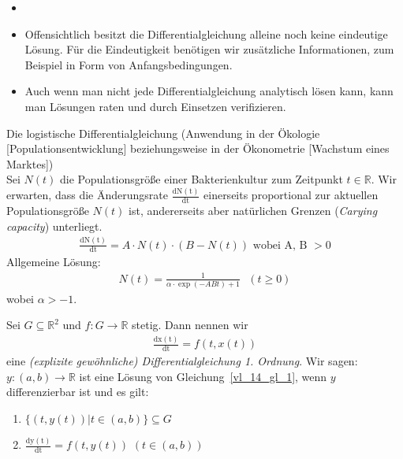 \begin{Bemerkung}{
	\begin{itemize}
		\item[ ]
		\item Offensichtlich besitzt die Differentialgleichung alleine noch keine 
		eindeutige Lösung. Für die Eindeutigkeit benötigen wir zusätzliche
		 Informationen, zum Beispiel in Form von Anfangsbedingungen.
		\item Auch wenn man nicht jede Differentialgleichung analytisch lösen kann, 
		kann man Lösungen raten und durch Einsetzen verifizieren.
	\end{itemize}
}\end{Bemerkung}

\begin{Beispiel}{
	Die logistische Differentialgleichung (Anwendung in der Ökologie 
	[Populationsentwicklung] beziehungsweise in der Ökonometrie [Wachstum 
	eines Marktes]) \\
	Sei $N(t)$ die Populationsgröße einer Bakterienkultur zum Zeitpunkt $t \in 
	\mathbb{R}$. Wir erwarten, dass die Änderungsrate $\frac{\mathrm{dN(t)}}{\mathrm{dt}}$ einerseits proportional zur aktuellen Populationsgröße $N(t)$ ist, 
	andererseits aber natürlichen Grenzen (\emph{Carying capacity}) unterliegt.
	\begin{align*}
		\frac{\mathrm{dN(t)}}{\mathrm{dt}} = A \cdot N(t) \cdot (B - N(t))
		\text{ wobei A, B } > 0
	\end{align*}
	Allgemeine Lösung:
	\begin{align*}
		N(t) = \frac{1}{\alpha \cdot \exp(-ABt) + 1} \text{ }(t \geq 0) 
	\end{align*}
	wobei $\alpha > -1$.
}\end{Beispiel}

\begin{Definition}{
	Sei $G \subseteq \mathbb{R}^2$ und $f : G \rightarrow \mathbb{R}$ stetig. Dann 
	nennen wir
	\begin{align}\label{vl_14_gl_1}
		\frac{\mathrm{dx(t)}}{\mathrm{dt}} = f(t,x(t))
	\end{align}
	eine \emph{(explizite gewöhnliche) Differentialgleichung 1. Ordnung}. Wir 
	sagen:\\
		$y : (a,b) \rightarrow \mathbb{R}$ ist eine Lösung von 
	Gleichung~\ref{vl_14_gl_1}, wenn $y$ differenzierbar ist und es gilt:
	\renewcommand{\labelenumi}{\roman{enumi})}
	\begin{enumerate}
		\item\label{vl_14_punkt_i} $\{(t,y(t)) \vert t \in (a,b)\} \subseteq G$
		\item\label{vl_14_punkt_ii} 
			$\frac{\mathrm{dy(t)}}{\mathrm{dt}} = f(t, y(t))$ $(t \in (a,b))$
	\end{enumerate}
}\end{Definition}


